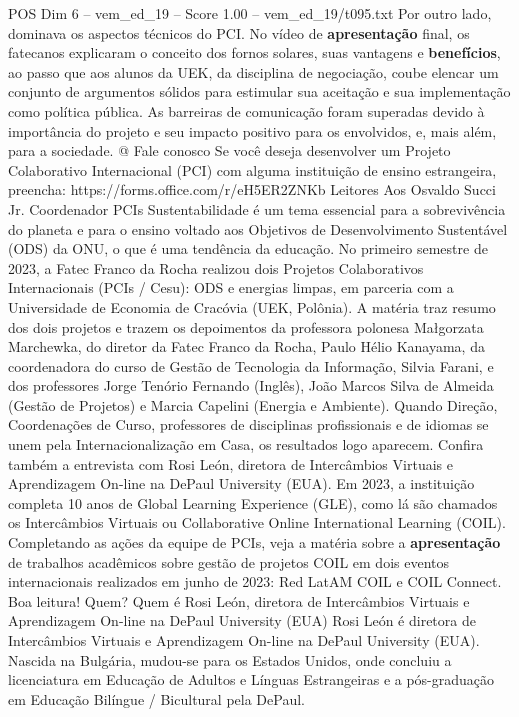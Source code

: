 \begin{textsample}{POS Dim 6 – vem\_ed\_19 – Score 1.00 – vem\_ed\_19/t095.txt}
Por outro lado, dominava os aspectos técnicos do PCI.
No vídeo de \textbf{apresentação} final, os fatecanos explicaram o conceito dos fornos solares, suas vantagens e \textbf{benefícios}, ao passo que aos alunos da UEK, da disciplina de negociação, coube elencar um conjunto de argumentos sólidos para estimular sua aceitação e sua implementação como política pública.
As barreiras de comunicação foram superadas devido à importância do projeto e seu impacto positivo para os envolvidos, e, mais além, para a sociedade. @ Fale conosco Se você deseja desenvolver um Projeto Colaborativo Internacional (PCI) com alguma instituição de ensino estrangeira, preencha: https://forms.office.com/r/eH5ER2ZNKb Leitores Aos Osvaldo Succi Jr.
Coordenador PCIs Sustentabilidade é um tema essencial para a sobrevivência do planeta e para o ensino voltado aos Objetivos de Desenvolvimento Sustentável (ODS) da ONU, o que é uma tendência da educação.
No primeiro semestre de 2023, a Fatec Franco da Rocha realizou dois Projetos Colaborativos Internacionais (PCIs / Cesu): ODS e energias limpas, em parceria com a Universidade de Economia de Cracóvia (UEK, Polônia).
A matéria traz resumo dos dois projetos e trazem os depoimentos da professora polonesa Małgorzata Marchewka, do diretor da Fatec Franco da Rocha, Paulo Hélio Kanayama, da coordenadora do curso de Gestão de Tecnologia da Informação, Silvia Farani, e dos professores Jorge Tenório Fernando (Inglês), João Marcos Silva de Almeida (Gestão de Projetos) e Marcia Capelini (Energia e Ambiente).
Quando Direção, Coordenações de Curso, professores de disciplinas profissionais e de idiomas se unem pela Internacionalização em Casa, os resultados logo aparecem.
Confira também a entrevista com Rosi León, diretora de Intercâmbios Virtuais e Aprendizagem On-line na DePaul University (EUA).
Em 2023, a instituição completa 10 anos de Global Learning Experience (GLE), como lá são chamados os Intercâmbios Virtuais ou Collaborative Online International Learning (COIL).
Completando as ações da equipe de PCIs, veja a matéria sobre a \textbf{apresentação} de trabalhos acadêmicos sobre gestão de projetos COIL em dois eventos internacionais realizados em junho de 2023: Red LatAM COIL e COIL Connect.
Boa leitura!
Quem?
Quem é Rosi León, diretora de Intercâmbios Virtuais e Aprendizagem On-line na DePaul University (EUA) Rosi León é diretora de Intercâmbios Virtuais e Aprendizagem On-line na DePaul University (EUA).
Nascida na Bulgária, mudou-se para os Estados Unidos, onde concluiu a licenciatura em Educação de Adultos e Línguas Estrangeiras e a pós-graduação em Educação Bilíngue / Bicultural pela DePaul.

\end{textsample}
